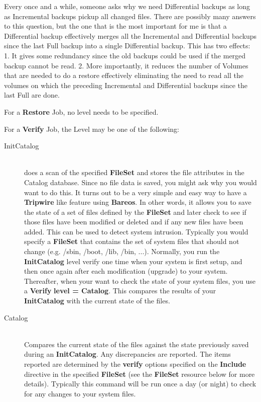 \begin{description}
\begin{description}
Every once and a while, someone asks why we need Differential
backups as long as Incremental backups pickup all changed files.
There are possibly many answers to this question, but the one
that is the most important for me is that a Differential backup
effectively merges
all the Incremental and Differential backups since the last Full backup
into a single Differential backup.  This has two effects: 1.  It gives
some redundancy since the old backups could be used if the merged backup
cannot be read.  2.  More importantly, it reduces the number of Volumes
that are needed to do a restore effectively eliminating the need to read
all the volumes on which the preceding Incremental and Differential
backups since the last Full are done.

\end{description}

For a {\bf Restore} Job, no level needs to be specified.

For a {\bf Verify} Job, the Level may be one of the  following:

\begin{description}

\item [InitCatalog] \hfill \\
does a scan of the specified {\bf FileSet} and stores the file
attributes in the Catalog database.  Since no file data is saved, you
might ask why you would want to do this.  It turns out to be a very
simple and easy way to have a {\bf Tripwire} like feature using {\bf
Bareos}.  In other words, it allows you to save the state of a set of
files defined by the {\bf FileSet} and later check to see if those files
have been modified or deleted and if any new files have been added.
This can be used to detect system intrusion.  Typically you would
specify a {\bf FileSet} that contains the set of system files that
should not change (e.g.  /sbin, /boot, /lib, /bin, ...).  Normally, you
run the {\bf InitCatalog} level verify one time when your system is
first setup, and then once again after each modification (upgrade) to
your system.  Thereafter, when your want to check the state of your
system files, you use a {\bf Verify} {\bf level = Catalog}.  This
compares the results of your {\bf InitCatalog} with the current state of
the files.

\item [Catalog] \hfill \\
Compares the current state of the files against the state previously
saved during an {\bf InitCatalog}.  Any discrepancies are reported.  The
items reported are determined by the {\bf verify} options specified on
the {\bf Include} directive in the specified {\bf FileSet} (see the {\bf
FileSet} resource below for more details).  Typically this command will
be run once a day (or night) to check for any changes to your system
files.


\end{description}
\end{description}
